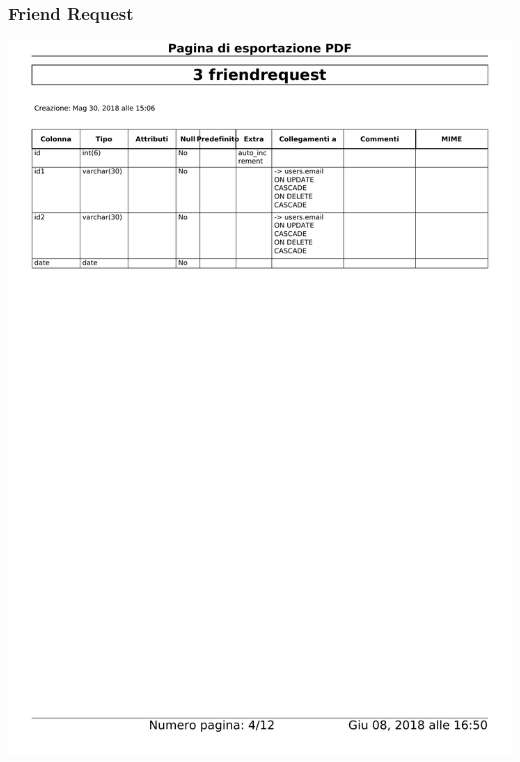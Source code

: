 \documentclass{article}
\begin{document}
    \subsubsection{Friend Request}
    \begin{center}
        \includegraphics[width=15cm]{images/friendrequest}
    \end{center}
\end{document}
